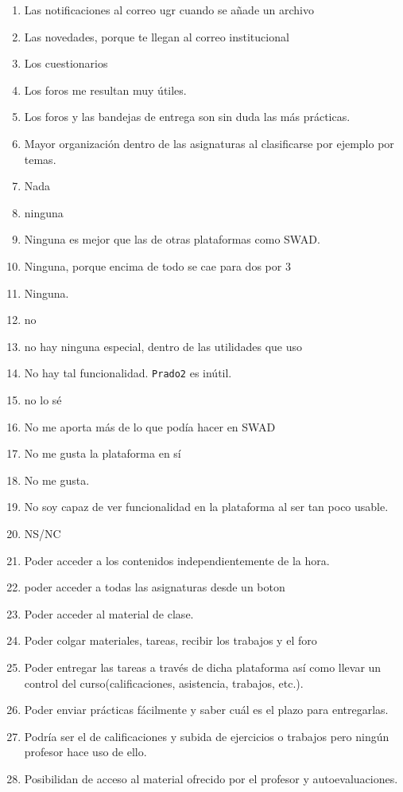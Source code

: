 \begin{enumerate}
\item Las notificaciones al correo ugr cuando se añade un archivo
\item Las novedades, porque te llegan al correo institucional
\item Los cuestionarios
\item Los foros me resultan muy útiles.
\item Los foros y las bandejas de entrega son sin duda las más prácticas.
\item Mayor organización dentro de las asignaturas al clasificarse por ejemplo por temas.
\item Nada
\item ninguna
\item Ninguna es mejor que las de otras plataformas como SWAD.
\item Ninguna, porque encima de todo se cae para dos por 3
\item Ninguna.
\item no
\item no hay ninguna especial, dentro de las utilidades que uso
\item No hay tal funcionalidad. \texttt{Prado2} es inútil.
\item no lo sé
\item No me aporta más de lo que podía hacer en SWAD
\item No me gusta la plataforma en sí
\item No me gusta.
\item No soy capaz de ver funcionalidad en la plataforma al ser tan poco usable.
\item NS/NC
\item Poder acceder a los contenidos independientemente de la hora.
\item poder acceder a todas las asignaturas desde un boton
\item Poder acceder al material de clase.
\item Poder colgar materiales, tareas, recibir los trabajos y el foro
\item Poder entregar las tareas a través de dicha plataforma así como llevar un control del curso(calificaciones, asistencia, trabajos, etc.).
\item Poder enviar prácticas fácilmente y saber cuál es el plazo para entregarlas.
\item Podría ser el de calificaciones y subida de ejercicios o trabajos pero ningún profesor hace uso de ello.
\item Posibilidan de acceso al material ofrecido por el profesor y autoevaluaciones.

\end{enumerate}
